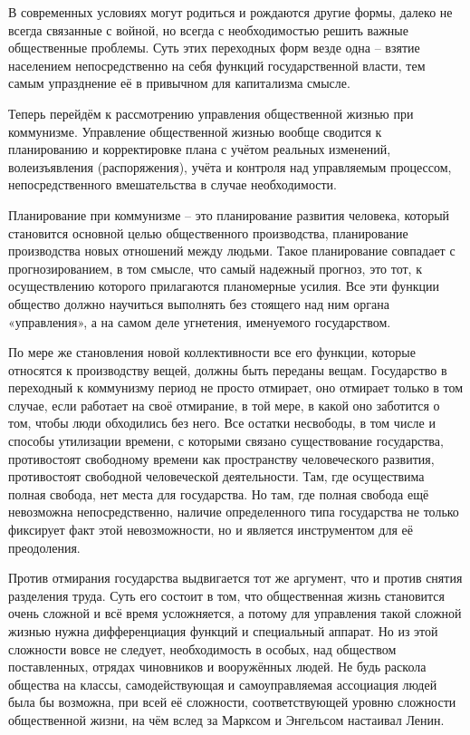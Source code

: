 \documentclass[12pt,a4paper,openany]{book}
\begin{document}
В современных условиях могут родиться и рождаются другие формы, далеко не всегда связанные с войной, но всегда с необходимостью решить важные общественные проблемы. Суть этих переходных форм везде одна – взятие населением непосредственно на себя функций государственной власти, тем самым упразднение её в привычном для капитализма смысле.

Теперь перейдём к рассмотрению управления общественной жизнью при коммунизме. Управление общественной жизнью вообще сводится к планированию и корректировке плана с учётом реальных изменений, волеизъявления (распоряжения), учёта и контроля над управляемым процессом, непосредственного вмешательства в случае необходимости.

Планирование при коммунизме – это планирование развития человека, который становится основной целью общественного производства, планирование производства новых отношений между людьми. Такое планирование совпадает с прогнозированием, в том смысле, что самый надежный прогноз, это тот, к осуществлению которого прилагаются планомерные усилия. Все эти функции общество должно научиться выполнять без стоящего над ним органа «управления», а на самом деле угнетения, именуемого государством.

По мере же становления новой коллективности все его функции, которые относятся к производству вещей, должны быть переданы вещам. Государство в переходный к коммунизму период не просто отмирает, оно отмирает только в том случае, если работает на своё отмирание, в той мере, в какой оно заботится о том, чтобы люди обходились без него. Все остатки несвободы, в том числе и способы утилизации времени, с которыми связано существование государства, противостоят свободному времени как пространству человеческого развития, противостоят свободной человеческой деятельности. Там, где осуществима полная свобода, нет места для государства. Но там, где полная свобода ещё невозможна непосредственно, наличие определенного типа государства не только фиксирует факт этой невозможности, но и является инструментом для её преодоления.

Против отмирания государства выдвигается тот же аргумент, что и против снятия разделения труда. Суть его состоит в том, что общественная жизнь становится очень сложной и всё время усложняется, а потому для управления такой сложной жизнью нужна дифференциация функций и специальный аппарат. Но из этой сложности вовсе не следует, необходимость в особых, над обществом поставленных, отрядах чиновников и вооружённых людей. Не будь раскола общества на классы, самодействующая и самоуправляемая ассоциация людей была бы возможна, при всей её сложности, соответствующей уровню сложности общественной жизни, на чём вслед за Марксом и Энгельсом настаивал Ленин.
\end{document}
